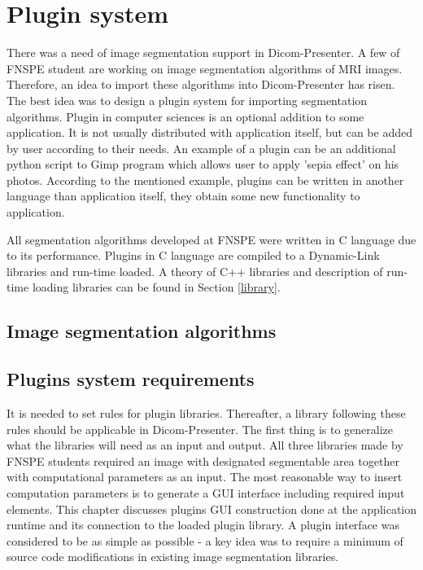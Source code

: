 \chapter{Plugin system}
\vspace{-10mm}

There was a need of image segmentation support in Dicom-Presenter. A few of FNSPE student are working on image segmentation algorithms of MRI images. Therefore, an idea to import these algorithms into Dicom-Presenter has risen. The best idea was to design a plugin system for importing segmentation algorithms.
Plugin in computer sciences is an optional addition to some application. It is not usually distributed with application itself, but can be added by user according to their needs. An example of a plugin can be an additional python script to Gimp program which allows user to apply 'sepia effect' on his photos. According to the mentioned example, plugins can be written in another language than application itself, they obtain some new functionality to application.


All segmentation algorithms developed at FNSPE were written in C language due to its performance. Plugins in C language are compiled to a Dynamic-Link libraries and run-time loaded. A theory of C++ libraries and description of run-time loading libraries can be found in Section \ref{library}.

\section{Image segmentation algorithms}


\section{Plugins system requirements}

It is needed to set rules for plugin libraries. Thereafter, a library following these rules should be applicable in Dicom-Presenter. The first thing is to generalize what the libraries will need as an input and output. All three libraries made by FNSPE students required an image with designated segmentable area together with computational parameters as an input. The most reasonable way to insert computation parameters is to generate a GUI interface including required input elements. This chapter discusses plugins GUI construction done at the application runtime and its connection to the loaded plugin library. A plugin interface was considered to be as simple as possible - a key idea was to require a minimum of source code modifications in existing image segmentation libraries.

